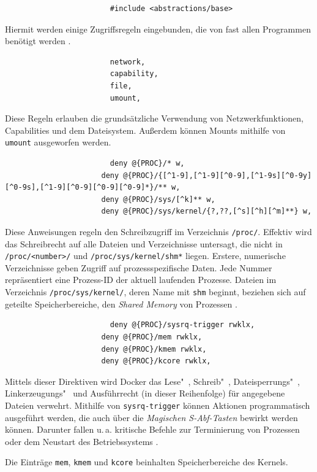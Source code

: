 \documentclass[../main.tex]{subfiles}
\begin{document}
					\begin{lstlisting}
						#include <abstractions/base>
					\end{lstlisting}
					Hiermit werden einige Zugriffsregeln eingebunden, die von fast allen Programmen benötigt werden \cite[S.100]{SELinuxApparmor}.

					\begin{lstlisting}
						network,
						capability,
						file,
						umount,
					\end{lstlisting}
					Diese Regeln erlauben die grundsätzliche Verwendung von Netzwerkfunktionen, Capabilities und dem Dateisystem. Außerdem können Mounts mithilfe von \texttt{umount} ausgeworfen werden.

					\begin{lstlisting}
						deny @{PROC}/* w,
					  deny @{PROC}/{[^1-9],[^1-9][^0-9],[^1-9s][^0-9y][^0-9s],[^1-9][^0-9][^0-9][^0-9]*}/** w,
					  deny @{PROC}/sys/[^k]** w,
					  deny @{PROC}/sys/kernel/{?,??,[^s][^h][^m]**} w,
					\end{lstlisting}
					Diese Anweisungen regeln den Schreibzugriff im Verzeichnis \texttt{/proc/}. Effektiv wird das Schreibrecht auf alle Dateien und Verzeichnisse untersagt, die nicht in \texttt{/proc/<number>/} und \texttt{/proc/sys/kernel/shm*} liegen. Erstere, numerische Verzeichnisse geben Zugriff auf prozessspezifische Daten. Jede Nummer repräsentiert eine Prozess-ID der aktuell laufenden Prozesse. Dateien im Verzeichnis \texttt{/proc/sys/kernel/}, deren Name mit \texttt{shm} beginnt, beziehen sich auf geteilte Speicherbereiche, den \emph{Shared Memory} von Prozessen \cite{apparmorShm}.

					\begin{lstlisting}
						deny @{PROC}/sysrq-trigger rwklx,
					  deny @{PROC}/mem rwklx,
					  deny @{PROC}/kmem rwklx,
					  deny @{PROC}/kcore rwklx,
					\end{lstlisting}
					Mittels dieser Direktiven wird Docker das Lese"~, Schreib"~, Dateisperrungs"~, Linkerzeugungs"~ und Ausführrecht (in dieser Reihenfolge) für angegebene Dateien verwehrt. Mithilfe von \texttt{sysrq-trigger} können Aktionen programmatisch ausgeführt werden, die auch über die \emph{Magischen S-Abf-Tasten} bewirkt werden können. Darunter fallen u.\,a. kritische Befehle zur Terminierung von Prozessen oder dem Neustart des Betriebssystems \cite{apparmorMagicSysRQ}\cite{apparmorSysrqTrigger}.

					Die Einträge \texttt{mem}, \texttt{kmem} und \texttt{kcore} beinhalten Speicherbereiche des Kernels.
\end{document}
